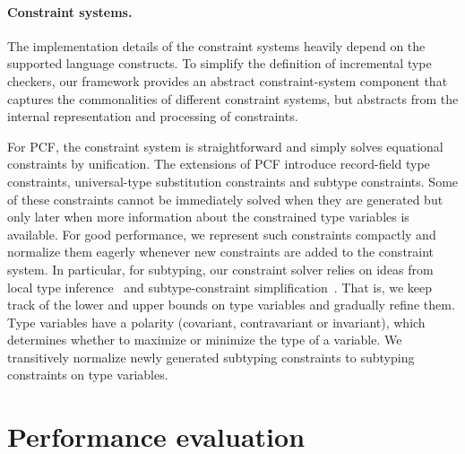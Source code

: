 \documentclass{llncs}
\begin{document}



\paragraph{Constraint systems.} The implementation details of the constraint
systems heavily depend on the supported language constructs. To simplify the definition of
incremental type checkers, our framework provides an abstract
constraint-system component that captures the commonalities of different
constraint systems, but abstracts from the internal representation and processing
of constraints.

For PCF, the constraint system is straightforward and simply solves equational constraints by
unification. The extensions of PCF introduce record-field type constraints, universal-type substitution
constraints and subtype constraints. Some of these constraints cannot be immediately
solved when they are generated but only later when more information about the
constrained type variables is available. For good performance, we
represent such constraints compactly and normalize them eagerly whenever new
constraints are added to the constraint system. 
%
In particular, for subtyping, our constraint solver relies on ideas 
from local type inference~\cite{PierceT00} and subtype-constraint simplification~\cite{Pottier01}.
That is, we keep track of the lower and upper bounds on type variables and
gradually refine them. Type variables have a polarity (covariant, contravariant
or invariant), which determines whether to maximize or minimize the type of a
variable.  We transitively normalize newly generated subtyping constraints to
subtyping constraints on type variables.  

\section{Performance evaluation}
\label{sec:performance}
\end{document}
